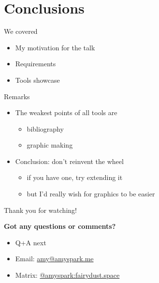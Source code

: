 \documentclass[aspectratio=169]{fireshonks}
\begin{document}
\section*{Conclusions}
\begin{frame}{We covered}
  \begin{itemize}
    \item My motivation for the talk
    \item Requirements
    \item Tools showcase
  \end{itemize}
\end{frame}
\begin{frame}{Remarks}
  \begin{itemize}
    \item The weakest points of all tools are
          \begin{itemize}
            \item bibliography
            \item graphic making
          \end{itemize}
    \item Conclusion: don't reinvent the wheel
          \begin{itemize}
            \item if you have one, try extending it
            \item but I'd really wish for graphics to be easier
          \end{itemize}
  \end{itemize}
\end{frame}
\begin{frame}{Thank you for watching!}
  \begin{center}
    {
      \large
      \textbf{Got any questions or comments?}
    }
    \begin{itemize}[<*>]
      \item Q+A next
      \item Email: \href{mailto:amy@amyspark.me?subject="DiVOC 2022"}{amy@amyspark.me}
      \item Matrix: \href{https://matrix.to/\#/@amyspark:fairydust.space}{@amyspark:fairydust.space}
    \end{itemize}
  \end{center}
\end{frame}
\end{document}
